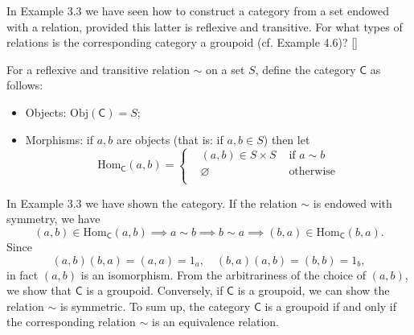 \documentclass[12pt,letterpaper,boxed]{hmcpset}
\begin{document}
\begin{problem}[4.2]
	In Example 3.3 we have seen how to construct a category from a set endowed	with a relation, provided this latter is reflexive and transitive. For what types of relations is the corresponding category a groupoid (cf. Example 4.6)? []
\end{problem}
\begin{solution}
	For a reflexive and transitive relation $\sim$ on a set $S$, define the category $\mathsf{C}$ as follows:
	\begin{itemize}
		\item Objects: $\mathrm{Obj}(\mathsf{C})=S$;
		\item Morphisms: if $a, b$ are objects (that is: if $a, b \in S$) then let 
		\[
		\mathrm{Hom}_\mathsf{C}(a, b)=
		\left\{
		\begin{aligned}
		&(a, b)\in S\times S &\text{ if } a\sim b\\	
		& \varnothing &\text{ otherwise}\\
		\end{aligned}
		\right.
		\]
	\end{itemize}
	In Example 3.3 we have shown the category. If the relation $\sim$ is endowed with symmetry, we have
	\[
	(a,b)\in\mathrm{Hom}_\mathsf{C}(a, b)\implies a\sim b\implies b\sim a\implies (b,a)\in\mathrm{Hom}_\mathsf{C}(b, a).
	\]
	Since
	\[
	(a,b)(b, a)=(a,a)=1_a,\quad(b, a)(a,b)=(b,b)=1_b,
	\]
	in fact $(a,b)$ is an isomorphism. From the arbitrariness of the choice of $(a,b)$, we show that $\mathsf{C}$ is a groupoid. Conversely, if $\mathsf{C}$ is a groupoid, we can show the relation $\sim$ is symmetric. To sum up, the category $\mathsf{C}$ is a groupoid
	if and only if the corresponding relation $\sim$ is an equivalence relation.
\end{solution}
\end{document}
